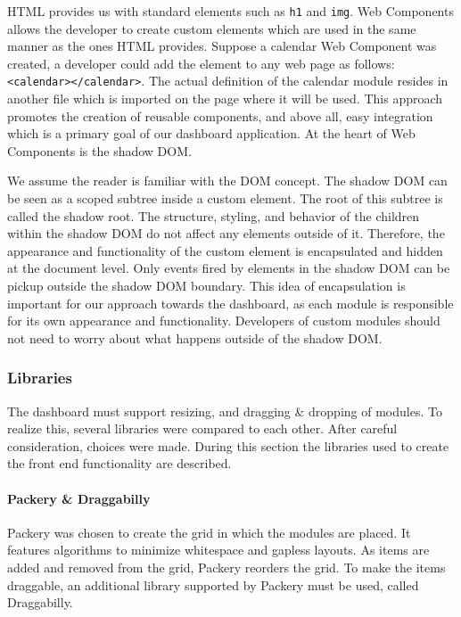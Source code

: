 
            HTML provides us with standard elements such as \texttt{h1} and \texttt{img}. Web Components allows the developer to create custom elements which are used in the same manner as the ones HTML provides. Suppose a calendar Web Component was created, a developer could add the element to any web page as follows: \texttt{<calendar></calendar>}. The actual definition of the calendar module resides in another file which is imported on the page where it will be used. This approach promotes the creation of reusable components, and above all, easy integration which is a primary goal of our dashboard application. At the heart of Web Components is the shadow DOM\@.


            We assume the reader is familiar with the DOM concept. The shadow DOM can be seen as a scoped subtree inside a custom element. The root of this subtree is called the shadow root. The structure, styling, and behavior of the children within the shadow DOM do not affect any elements outside of it. Therefore, the appearance and functionality of the custom element is encapsulated and hidden at the document level. Only events fired by elements in the shadow DOM can be pickup outside the shadow DOM boundary. This idea of encapsulation is important for our approach towards the dashboard, as each module is responsible for its own appearance and functionality. Developers of custom modules should not need to worry about what happens outside of the shadow DOM\@.

        \subsubsection{Libraries}

        The dashboard must support resizing, and dragging \& dropping of modules. To realize this, several libraries were compared to each other. After careful consideration, choices were made. During this section the libraries used to create the front end functionality are described.

            \paragraph{Packery \& Draggabilly} Packery was chosen to create the grid in which the modules are placed. It features algorithms to minimize whitespace and gapless layouts. As items are added and removed from the grid, Packery reorders the grid. To make the items draggable, an additional library supported by Packery must be used, called Draggabilly. 

